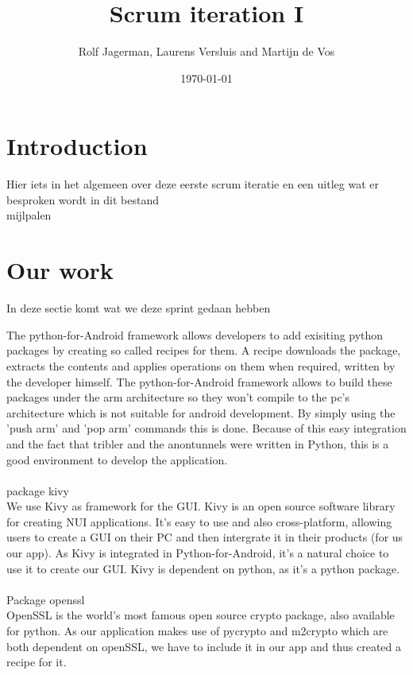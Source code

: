 \documentclass{article}
\title{Scrum iteration I}
\author{Rolf Jagerman, Laurens Versluis and Martijn de Vos}
\date{\today}
\begin{document}
\maketitle

\newpage

\section{Introduction}
Hier iets in het algemeen over deze eerste scrum iteratie en een uitleg wat er besproken wordt in dit bestand\\
mijlpalen\\


\section{Our work}
In deze sectie komt wat we deze sprint gedaan hebben

The python-for-Android framework allows developers to add exisiting python packages by creating so called recipes for them.
A recipe downloads the package, extracts the contents and applies operations on them when required, written by the developer himself.
The python-for-Android framework allows to build these packages under the arm architecture so they won't compile to the pc's architecture which is not suitable for android development. By simply using the 'push arm' and 'pop arm' commands this is done. Because of this easy integration and the fact that tribler and the anontunnels were written in Python, this is a good environment to develop the application.\\\\

package kivy\\

We use Kivy as framework for the GUI. Kivy is an open source software library for creating NUI applications. It's easy to use and also cross-platform, allowing users to create a GUI on their PC and then intergrate it in their products (for us our app). As Kivy is integrated in Python-for-Android, it's a natural choice to use it to create our GUI. Kivy is dependent on python, as it's a python package. 
\\\\
Package openssl\\

OpenSSL is the world's most famous open source crypto package, also available for python. As our application makes use of pycrypto and m2crypto which are both dependent on openSSL, we have to include it in our app and thus created a recipe for it. \\\\
\end{document}
